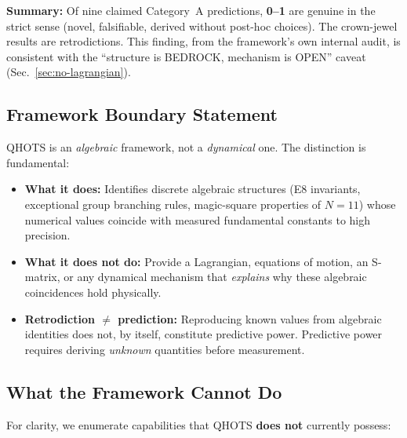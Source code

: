 \documentclass[aps,prd,twocolumn,superscriptaddress,floatfix,nofootinbib]{revtex4-2}
\theoremstyle{definition}
\theoremstyle{remark}
\begin{document}
\noindent
\textbf{Summary:} Of nine claimed Category~A predictions,
\textbf{0--1} are genuine in the strict sense (novel, falsifiable,
derived without post-hoc choices).  The crown-jewel results are
retrodictions.  This finding, from the framework's own internal audit,
is consistent with the ``structure is BEDROCK, mechanism is OPEN''
caveat (Sec.~\ref{sec:no-lagrangian}).

\subsection{Framework Boundary Statement}
\label{sec:framework-boundary}

QHOTS is an \emph{algebraic} framework, not a \emph{dynamical} one.
The distinction is fundamental:

\begin{itemize}
\item \textbf{What it does:} Identifies discrete algebraic structures
      (E8 invariants, exceptional group branching rules, magic-square
      properties of $N{=}11$) whose numerical values coincide with
      measured fundamental constants to high precision.

\item \textbf{What it does not do:} Provide a Lagrangian, equations of
      motion, an S-matrix, or any dynamical mechanism that
      \emph{explains} why these algebraic coincidences hold physically.

\item \textbf{Retrodiction $\neq$ prediction:} Reproducing known
      values from algebraic identities does not, by itself, constitute
      predictive power.  Predictive power requires deriving
      \emph{unknown} quantities before measurement.
\end{itemize}

\subsection{What the Framework Cannot Do}

For clarity, we enumerate capabilities that QHOTS \textbf{does not}
currently possess:
\end{document}
